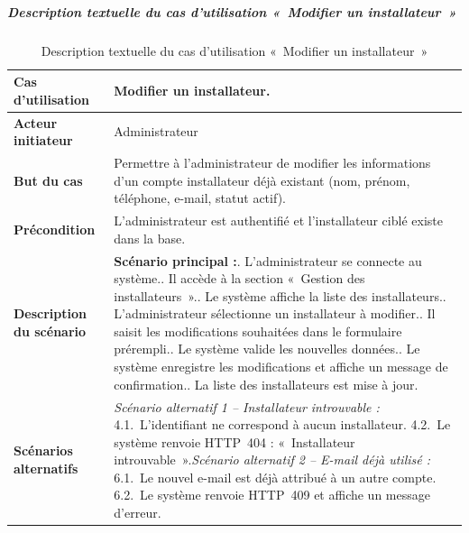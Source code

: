 \subparagraph{Description textuelle du cas d'utilisation «~Modifier un installateur~»}

\begin{table}[H]
  \caption{Description textuelle du cas d'utilisation «~Modifier un installateur~»}
  \label{tab:cu-modifier-installateur}
  \centering
  \begin{tabularx}{\textwidth}{|L{3.8cm}|X|}
    \hline
    \textbf{Cas d'utilisation} & Modifier un installateur. \\
    \hline
    \textbf{Acteur initiateur} & Administrateur \\
    \hline
    \textbf{But du cas} & Permettre à l'administrateur de modifier les informations d'un compte installateur déjà existant (nom, prénom, téléphone, e-mail, statut actif). \\
    \hline
    \textbf{Précondition} & L'administrateur est authentifié et l'installateur ciblé existe dans la base. \\
    \hline
    \textbf{Description du scénario} &
    \textbf{Scénario principal :}. L'administrateur se connecte au système.. Il accède à la section «~Gestion des installateurs~».. Le système affiche la liste des installateurs.. L'administrateur sélectionne un installateur à modifier.. Il saisit les modifications souhaitées dans le formulaire prérempli.. Le système valide les nouvelles données.. Le système enregistre les modifications et affiche un message de confirmation.. La liste des installateurs est mise à jour.\\
    \hline
    \textbf{Scénarios alternatifs} &
    \textit{Scénario alternatif 1 -- Installateur introuvable :}\newline
    \hspace*{6pt}4.1.~L'identifiant ne correspond à aucun installateur.\newline
    \hspace*{6pt}4.2.~Le système renvoie HTTP~404 : «~Installateur introuvable~».\newline[2pt]
    \textit{Scénario alternatif 2 -- E-mail déjà utilisé :}\newline
    \hspace*{6pt}6.1.~Le nouvel e-mail est déjà attribué à un autre compte.\newline
    \hspace*{6pt}6.2.~Le système renvoie HTTP~409 et affiche un message d'erreur.\\
    \hline
  \end{tabularx}
\end{table}

